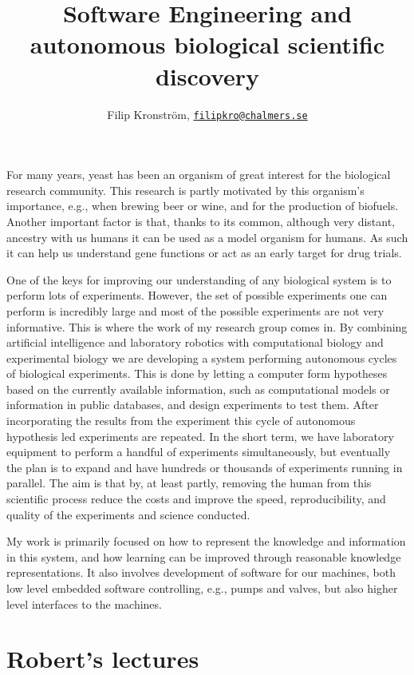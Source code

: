 \documentclass[11pt]{article}
\title{Software Engineering and autonomous biological scientific discovery}
\author{Filip Kronström, \href{mailto:filipkro@chalmers.se}{\nolinkurl{filipkro@chalmers.se}}}
\begin{document}
\maketitle

For many years, yeast has been an organism of great interest for the biological research community. This research is partly motivated by this organism's importance, e.g., when brewing beer or wine, and for the production of biofuels. Another important factor is that, thanks to its common, although very distant, ancestry with us humans it can be used as a model organism for humans. As such it can help us understand gene functions or act as an early target for drug trials.

One of the keys for improving our understanding of any biological system is to perform lots of experiments. However, the set of possible experiments one can perform is incredibly large and most of the possible experiments are not very informative. This is where the work of my research group comes in. By combining artificial intelligence and laboratory robotics with computational biology and experimental biology we are developing a system performing autonomous cycles of biological experiments. This is done by letting a computer form hypotheses based on the currently available information, such as computational models or information in public databases, and design experiments to test them. After incorporating the results from the experiment this cycle of autonomous hypothesis led experiments are repeated. In the short term, we have laboratory equipment to perform a handful of experiments simultaneously, but eventually the plan is to expand and have hundreds or thousands of experiments running in parallel. The aim is that by, at least partly, removing the human from this scientific process reduce the costs and improve the speed, reproducibility, and quality of the experiments and science conducted.

My work is primarily focused on how to represent the knowledge and information in this system, and how learning can be improved through reasonable knowledge representations. It also involves development of software for our machines, both low level embedded software controlling, e.g., pumps and valves, but also higher level interfaces to the machines.

\section*{Robert's lectures}
\end{document}
